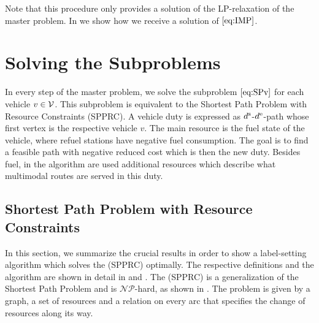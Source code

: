 Note that this procedure only provides a solution of the LP-relaxation of the master problem. In  we show how we receive a solution of $\eqref{eq:IMP}$.


\section{Solving the Subproblems}
\label{sec:solving_subproblem}

In every step of the master problem, we solve the subproblem $\eqref{eq:SPv}$ for each vehicle $v\in\mathcal{V}$. This subproblem is equivalent to the Shortest Path Problem with Resource Constraints (SPPRC). A vehicle duty is expressed as $d^{\operatorname{s}}$-$d^{\operatorname{e}}$-path whose first vertex is the respective vehicle $v$. The main resource is the fuel state of the vehicle, where refuel stations have negative fuel consumption. The goal is to find a feasible path with negative reduced cost which is then the new duty. Besides fuel, in the algorithm are used additional resources which describe what multimodal routes are served in this duty.

\subsection{Shortest Path Problem with Resource Constraints}
\label{sec:spprc}

In this section, we summarize the crucial results in order to show a label-setting algorithm which solves the (SPPRC) optimally. The respective definitions and the algorithm are shown in detail in \cite{Kaiser} and \cite{Irnich_Desaulniers}. The (SPPRC) is a generalization of the Shortest Path Problem and is $\mathcal{NP}$-hard, as shown in \cite[p.~307]{Handler_Zang}. The problem is given by a graph, a set of resources and a relation on every arc that specifies the change of resources along its way. 

